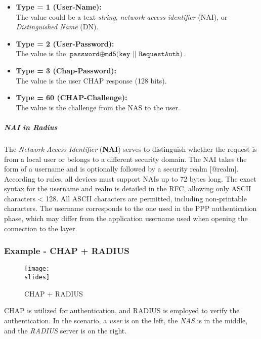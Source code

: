 \begin{itemize}
    \item \textbf{Type = 1 (User-Name):}\\ The value could be a text \textit{string}, \textit{network access identifier} (NAI), or \textit{Distinguished Name} (DN).
    \item \textbf{Type = 2 (User-Password):}\\ 
    The value is the \( \texttt{password} \oplus \texttt{md5(key || RequestAuth)} \).
    \item \textbf{Type = 3 (Chap-Password):}\\
    The value is the user CHAP response (128 bits).
    \item \textbf{Type = 60 (CHAP-Challenge):}\\
    The value is the challenge from the NAS to the user.
\end{itemize}

\subparagraph{NAI in Radius}
The \textit{Network Access Identifier} (\textbf{NAI}) serves to distinguish whether the request is from a local user or belongs to a different security domain. The NAI takes the form of a username and is optionally followed by a security realm [@realm]. According to rules, all devices must support NAIs up to 72 bytes long. The exact syntax for the username and realm is detailed in the RFC, allowing only ASCII characters < 128. All ASCII characters are permitted, including non-printable characters. The username corresponds to the one used in the PPP authentication phase, which may differ from the application username used when opening the connection to the layer.


\subsubsection{Example - CHAP + RADIUS}
\begin{figure}[h]
    \centering
    \texttt{[image: \\slides]}
    \caption{CHAP + RADIUS}
    \label{fig:chap-radius}
\end{figure}


CHAP is utilized for authentication, and RADIUS is employed to verify the authentication. In the scenario, a \textit{user} is on the left, the \textit{NAS} is in the middle, and the \textit{RADIUS} server is on the right.

